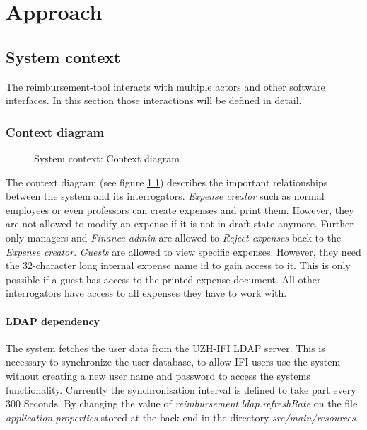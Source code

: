 \chapter{Approach}

\section{System context}

The reimbursement-tool interacts with multiple actors and other software interfaces. In this section those interactions will be defined in detail.

\subsection{Context diagram}

\begin{figure}[H]
    \centering
    \caption{System context: Context diagram}
    \label{fig:context-diagram}
\end{figure}

The context diagram (see figure \ref{fig:context-diagram}) describes the important relationships between the system and its interrogators. \textit{Expense creator} such as normal employees or even professors can create expenses and print them. However, they are not allowed to modify an expense if it is not in draft state anymore. Further only managers and \textit{Finance admin} are allowed to \textit{Reject expenses} back to the \textit{Expense creator}.\newline
\textit{Guests} are allowed to view specific expenses. However, they need the 32-character long internal expense name id to gain access to it. This is only possible if a guest has access to the printed expense document. All other interrogators have access to all expenses they have to work with.

\subsubsection{LDAP dependency}

The system fetches the user data from the UZH-IFI LDAP server. This is necessary to synchronize the user database, to allow IFI users use the system without creating a new user name and password to access the systems functionality. Currently the synchronisation interval is defined to take part every 300 Seconds. By changing the 
value of \textit{reimbursement.ldap.refreshRate} on the file \textit{application.properties} stored at the 
back-end in the directory \textit{src/main/resources}. 

